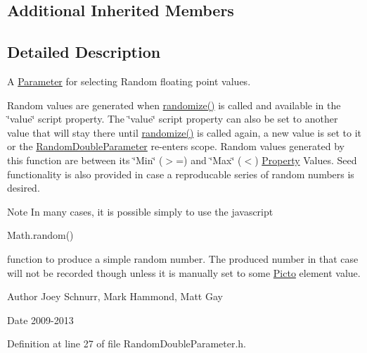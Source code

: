 \subsection*{Additional Inherited Members}


\subsection{Detailed Description}
A \hyperlink{class_picto_1_1_parameter}{Parameter} for selecting Random floating point values. 

Random values are generated when \hyperlink{class_picto_1_1_random_double_parameter_a8de295a1b08b19b4c413419df42fe7e9}{randomize()} is called and available in the \char`\"{}value\char`\"{} script property. The \char`\"{}value\char`\"{} script property can also be set to another value that will stay there until \hyperlink{class_picto_1_1_random_double_parameter_a8de295a1b08b19b4c413419df42fe7e9}{randomize()} is called again, a new value is set to it or the \hyperlink{class_picto_1_1_random_double_parameter}{Random\-Double\-Parameter} re-\/enters scope. Random values generated by this function are between its \char`\"{}\-Min\char`\"{} ($>$=) and \char`\"{}\-Max\char`\"{} ($<$) \hyperlink{class_picto_1_1_property}{Property} Values. Seed functionality is also provided in case a reproducable series of random numbers is desired. \begin{DoxyNote}{Note}
In many cases, it is possible simply to use the javascript
\begin{DoxyCode}
Math.random() 
\end{DoxyCode}
 function to produce a simple random number. The produced number in that case will not be recorded though unless it is manually set to some \hyperlink{namespace_picto}{Picto} element value.
\end{DoxyNote}
\begin{DoxyAuthor}{Author}
Joey Schnurr, Mark Hammond, Matt Gay 
\end{DoxyAuthor}
\begin{DoxyDate}{Date}
2009-\/2013 
\end{DoxyDate}


Definition at line 27 of file Random\-Double\-Parameter.\-h.



